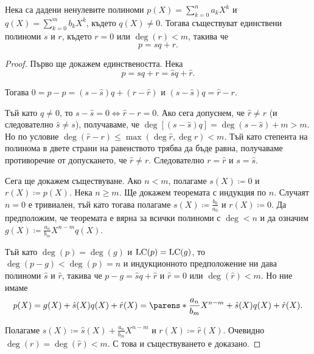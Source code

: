 \documentclass{../../common/topic}
\begin{document}
\begin{theorem}\label{thm:polynomial_division}
  Нека са дадени ненулевите полиноми \( p(X) = \sum_{k=0}^n a_k X^k \) и \( q(X) = \sum_{k=0}^m b_k X^k \), където \( q(X) \neq 0 \). Тогава съществуват единствени полиноми \( s \) и \( r \), където \( r = 0 \) или \( \deg(r) < m \), такива че
  \begin{equation*}
    p = sq + r.
  \end{equation*}
\end{theorem}
\begin{proof}
  Първо ще докажем единствеността. Нека
  \begin{equation*}
    p = sq + r = \hat sq + \hat r.
  \end{equation*}

  Тогава \( 0 = p - p = (s - \hat s) q + (r - \hat r) \) и \( (s - \hat s) q = \hat r - r \).

  Тъй като \( q \neq 0 \), то \( s - \hat s = 0 \iff \hat r - r = 0 \). Ако сега допуснем, че \( \hat r \neq r \) (и следователно \( \hat s \neq s \)), получаваме, че \( \deg[(s - \hat s) q] = \deg(s - \hat s) + m > m \). Но по условие \( \deg(\hat r - r) \leq \max(\deg \hat r, \deg r) < m \). Тъй като степента на полинома в двете страни на равенството трябва да бъде равна, получаваме противоречие от допускането, че \( \hat r \neq r \). Следователно \( r = \hat r \) и \( s = \hat s \).

  Сега ще докажем съществуване. Ако \( n < m \), полагаме \( s(X) \coloneqq 0 \) и \( r(X) \coloneqq p(X) \). Нека \( n \geq m \). Ще докажем теоремата с индукция по \( n \). Случаят \( n = 0 \) е тривиален, тъй като тогава полагаме \( s(X) \coloneqq \frac {b_0} {a_0} \) и \( r(X) \coloneqq 0 \). Да предположим, че теоремата е вярна за всички полиноми с \( \deg < n \) и да означим \( g(X) \coloneqq \frac {a_n} {b_m} X^{n-m} q(X) \).

  Тъй като \( \deg(p) = \deg(g) \) и \( \operatorname{LC}(p) = \operatorname{LC}(g) \), то \( \deg(p - g) < \deg(p) = n \) и индукционното предположение ни дава полиноми \( \hat s \) и \( \hat r \), такива че \( p - g = \hat s q + \hat r \) и \( \hat r = 0 \) или \( \deg(\hat r) < m \). Но ние имаме
  \begin{equation*}
    p(X)
    =
    g(X) + \hat s(X) q(X) + \hat r(X)
    =
    \parens*{ \frac {a_n} {b_m} X^{n-m} + \hat s(X) } q(X) + \hat r(X).
  \end{equation*}

  Полагаме \( s(X) \coloneqq \hat s(X) + \frac {a_n} {b_m} X^{n-m} \) и \( r(X) \coloneqq \hat r(X) \). Очевидно \( \deg(r) = \deg(\hat r) < m \). С това и съществуването е доказано.
\end{proof}
\end{document}
